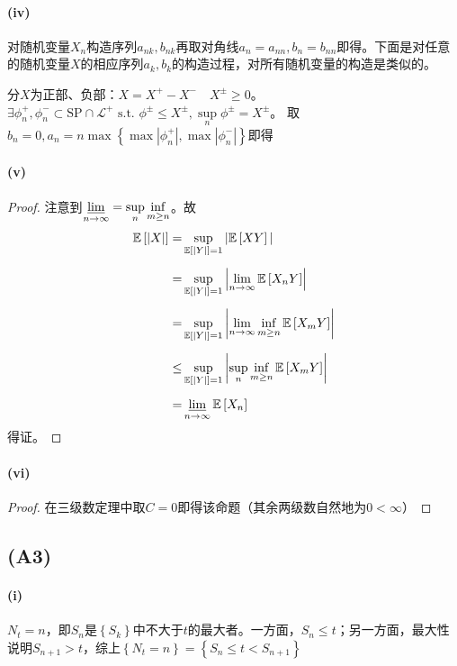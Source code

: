 \documentclass{ctexart}
\begin{document}
\paragraph{(iv)}
对随机变量$X_n$构造序列$a_{nk},b_{nk}$再取对角线$a_n=a_{nn}, b_n=b_{nn}$即得。下面是对任意的随机变量$X$的相应序列$a_k,b_k$的构造过程，对所有随机变量的构造是类似的。

分$X$为正部、负部：$X=X^+-X^{-} \quad X^{\pm}\geq 0$。$\exists \phi_n^+, \phi_n^- \subset \mathrm{SP}\cap \mathcal{L}^+\text{ s.t. } \phi^{\pm}\leq X^{\pm}, \sup\limits_n \phi^{\pm}=X^{\pm} $。
取$b_n=0, a_n=n\max \left\{ \max|\phi_n^+|,\max|\phi^-_n| \right\}$即得
\paragraph{(v)}
\begin{proof}
  注意到$\varliminf\limits_{n\to\infty}=\sup\limits_n \inf\limits_{m\geq n}$。故
\begin{align*}
  \underset{}{\mathbb{E}}\left[ |X|\right]=& \sup\limits_{\underset{}{\mathbb{E}}\left[ |Y|\right]=1 }|\underset{}{\mathbb{E}}\left[XY \right]| \\
  =&\sup\limits_{\underset{}{\mathbb{E}}\left[ |Y|\right]=1 }\left| \lim\limits_{n\to\infty}\underset{}{\mathbb{E}}\left[ X_nY\right]  \right|\\
  =&\sup\limits_{\underset{}{\mathbb{E}}\left[ |Y|\right]=1 }\left| \lim\limits_{n\to\infty}\inf\limits_{m\geq n}\underset{}{\mathbb{E}}\left[ X_mY\right]  \right|\\
  \leq &\sup\limits_{\underset{}{\mathbb{E}}\left[ |Y|\right]=1 }\left| \sup\limits_n \inf\limits_{m\geq n}\underset{}{\mathbb{E}}\left[ X_mY\right]  \right|\\
  =&\varliminf\limits_{n\to\infty}\underset{}{\mathbb{E}}\left[ X_n\right] 
\end{align*}
得证。
\end{proof}
\paragraph{(vi)}
\begin{proof}
  在三级数定理中取$C=0$即得该命题（其余两级数自然地为$0<\infty$）
\end{proof}

\subsection{(A3)}
\paragraph{(i)}
$N_t=n$，即$S_n$是$\left\{ S_k \right\}$中不大于$t$的最大者。一方面，$S_n\leq t$；另一方面，最大性说明$S_{n+1}>t$，综上$\left\{ N_t=n \right\}=\left\{ S_n\leq t<S_{n+1} \right\}$
\end{document}
